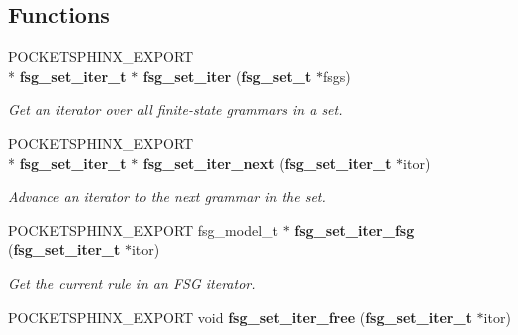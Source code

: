 \subsection*{Functions}
\begin{DoxyCompactItemize}
\item 
P\-O\-C\-K\-E\-T\-S\-P\-H\-I\-N\-X\-\_\-\-E\-X\-P\-O\-R\-T \\*
{\bf fsg\-\_\-set\-\_\-iter\-\_\-t} $\ast$ {\bf fsg\-\_\-set\-\_\-iter} ({\bf fsg\-\_\-set\-\_\-t} $\ast$fsgs)\label{fsg__set_8h_ae258fe4457affc6de5548330f33470ca}

\begin{DoxyCompactList}\small\item\em Get an iterator over all finite-\/state grammars in a set. \end{DoxyCompactList}\item 
P\-O\-C\-K\-E\-T\-S\-P\-H\-I\-N\-X\-\_\-\-E\-X\-P\-O\-R\-T \\*
{\bf fsg\-\_\-set\-\_\-iter\-\_\-t} $\ast$ {\bf fsg\-\_\-set\-\_\-iter\-\_\-next} ({\bf fsg\-\_\-set\-\_\-iter\-\_\-t} $\ast$itor)\label{fsg__set_8h_a50a455ce026c87a66d85363e874e982d}

\begin{DoxyCompactList}\small\item\em Advance an iterator to the next grammar in the set. \end{DoxyCompactList}\item 
P\-O\-C\-K\-E\-T\-S\-P\-H\-I\-N\-X\-\_\-\-E\-X\-P\-O\-R\-T fsg\-\_\-model\-\_\-t $\ast$ {\bf fsg\-\_\-set\-\_\-iter\-\_\-fsg} ({\bf fsg\-\_\-set\-\_\-iter\-\_\-t} $\ast$itor)\label{fsg__set_8h_a139c12323411b8366c66e97e112ca8c1}

\begin{DoxyCompactList}\small\item\em Get the current rule in an F\-S\-G iterator. \end{DoxyCompactList}\item 
P\-O\-C\-K\-E\-T\-S\-P\-H\-I\-N\-X\-\_\-\-E\-X\-P\-O\-R\-T void {\bf fsg\-\_\-set\-\_\-iter\-\_\-free} ({\bf fsg\-\_\-set\-\_\-iter\-\_\-t} $\ast$itor)\label{fsg__set_8h_a4e31d748ffd9d99fc626c2a1036c3699}


\end{DoxyCompactItemize}
